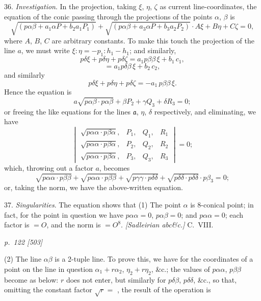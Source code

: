 \documentclass[11pt,a4paper]{book}
\begin{document}
36. \textit{Investigation}. In the projection, taking $\xi$, $\eta$, $\zeta$ as current line-coordinates, the
equation of the conic passing through the projections of the points $\alpha$, $\beta$ is
\[
\sqrt{(p\alpha\beta + a_1 \alpha P + b_2 a_1 P_1)} + \sqrt{(p\alpha\beta + a_3 \alpha P + b_3 a_2 P_2)} \cdot A \xi + B \eta + C \zeta = 0,
\]
where $A$, $B$, $C$ are arbitrary constants. To make this touch the projection of the
line $a$, we must write $\xi : \eta = -p_1\colon h_1 - h_1$; and similarly,
\[
p\delta \xi + p\delta \eta + p\delta \zeta = a_1 p\beta\beta\,\xi + b_1\,c_1,
\]
\[
= a_1 p\delta\beta\,\xi + b_2\,c_2,
\]
and similarly
\[
p\delta \xi + p\delta \eta + p\delta \zeta = -a_1\,p\beta\beta\,\xi.
\]
Hence the equation is
\[
a \sqrt{p\alpha\beta\cdot p\alpha\beta} + \beta P_2 + \gamma Q_3 + \delta R_3 = 0;
\]
or freeing the like equations for the lines $\mathfrak{a}$, $\eta$, $\delta$ respectively, and eliminating, we
have
\[
\begin{vmatrix}
\sqrt{p\alpha\alpha\cdot p\beta\alpha}, & P_1, & Q_1, & R_1 \\
\sqrt{p\alpha\alpha\cdot p\beta\alpha}, & P_2, & Q_2, & R_2 \\
\sqrt{p\alpha\alpha\cdot p\beta\alpha}, & P_3, & Q_3, & R_3
\end{vmatrix} = 0;
\]
which, throwing out a factor $a$, becomes
\[
\sqrt{p\alpha\alpha\cdot p\beta\beta} + \sqrt{p\alpha\alpha\cdot p\beta\beta} + \sqrt{p\gamma\gamma\cdot p\delta\delta} + \sqrt{p\delta\delta\cdot p\delta\delta} \cdot p\beta_3 = 0;
\]
or, taking the norm, we have the above-written equation.

37. \textit{Singularities}. The equation shows that
\quad(1) The point $\alpha$ is 8-conical point; in fact, for the point in question we have
$p\alpha\alpha = 0$, $p\alpha\beta = 0$; and $p\alpha\alpha = 0$; each factor is $= O$, and the norm
is $= O^8$.
\textit{[Sadleirian abc\&c.]} \hfill C.\ VIII.

\clearpage

\bigskip
\textit{p.~122 [503]}
\smallskip

\quad(2) The line $\alpha\beta$ is a 2-tuple line. To prove this, we have for the coordinates
of a point on the line in question $\alpha_1 + r\alpha_2$, $\eta_2 + r\eta_2$, \&c.; the values
of $p\alpha\alpha$, $p\beta\beta$ become as below: $r$ does not enter, but similarly for $p\delta\beta$, $p\delta\delta$,
\&c., so that, omitting the constant factor $\sqrt{r} = $ , the result of the
operation is

\end{document}
